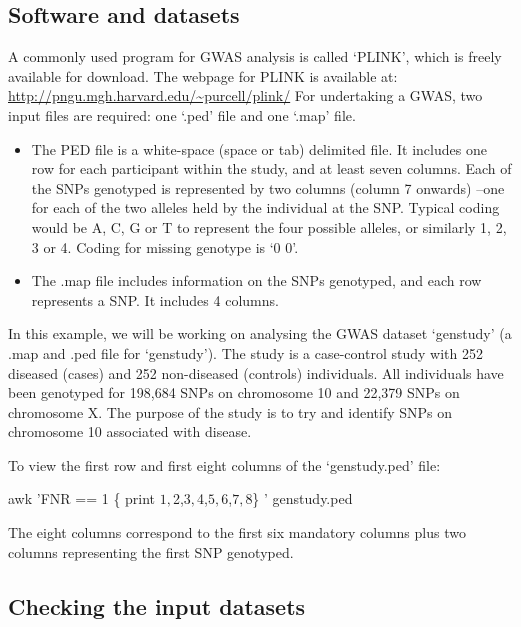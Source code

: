 \documentclass[]{book}
\newenvironment{Shaded}{\begin{snugshade}}{\end{snugshade}}
\newcommand{\StringTok}[1]{\textcolor[rgb]{0.31,0.60,0.02}{#1}}
\newcommand{\FunctionTok}[1]{\textcolor[rgb]{0.00,0.00,0.00}{#1}}
\newcommand{\NormalTok}[1]{#1}
\providecommand{\tightlist}{%
  \setlength{\itemsep}{0pt}\setlength{\parskip}{0pt}}
\begin{document}
\subsection{Software and datasets}\label{software-and-datasets}

A commonly used program for GWAS analysis is called `PLINK', which is
freely available for download. The webpage for PLINK is available at:
\url{http://pngu.mgh.harvard.edu/~purcell/plink/} For undertaking a
GWAS, two input files are required: one `.ped' file and one `.map' file.

\begin{itemize}
\tightlist
\item
  The PED file is a white-space (space or tab) delimited file. It
  includes one row for each participant within the study, and at least
  seven columns. Each of the SNPs genotyped is represented by two
  columns (column 7 onwards) --one for each of the two alleles held by
  the individual at the SNP. Typical coding would be A, C, G or T to
  represent the four possible alleles, or similarly 1, 2, 3 or 4. Coding
  for missing genotype is `0 0'.
\item
  The .map file includes information on the SNPs genotyped, and each row
  represents a SNP. It includes 4 columns.
\end{itemize}

In this example, we will be working on analysing the GWAS dataset
`genstudy' (a .map and .ped file for `genstudy'). The study is a
case-control study with 252 diseased (cases) and 252 non-diseased
(controls) individuals. All individuals have been genotyped for 198,684
SNPs on chromosome 10 and 22,379 SNPs on chromosome X. The purpose of
the study is to try and identify SNPs on chromosome 10 associated with
disease.

To view the first row and first eight columns of the `genstudy.ped'
file:

\begin{Shaded}
\begin{Highlighting}[]
\FunctionTok{awk} \StringTok{'FNR == 1 \{ print $1,$2,$3,$4,$5,$6,$7,$8\} '}\NormalTok{ genstudy.ped}
\end{Highlighting}
\end{Shaded}

The eight columns correspond to the first six mandatory columns plus two
columns representing the first SNP genotyped.

\subsection{Checking the input
datasets}\label{checking-the-input-datasets}
\end{document}
